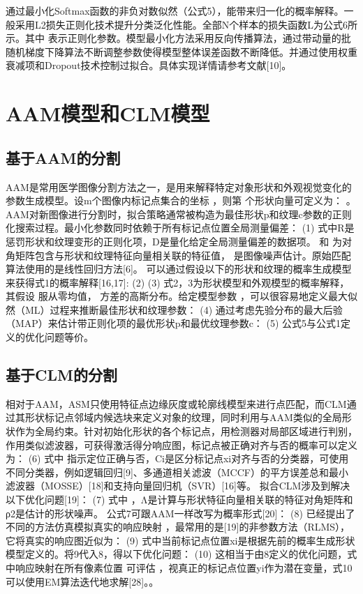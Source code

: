 通过最小化Softmax函数的非负对数似然（公式5），能带来归一化的概率解释。一般采用L2损失正则化技术提升分类泛化性能。全部N个样本的损失函数L为公式6所示。其中  表示正则化参数。模型最小化方法采用反向传播算法，通过带动量的批随机梯度下降算法不断调整参数使得模型整体误差函数不断降低。并通过使用权重衰减项和Dropout技术控制过拟合。具体实现详情请参考文献[10]。

\section{AAM模型和CLM模型} 
\subsection{基于AAM的分割} 
AAM是常用医学图像分割方法之一，是用来解释特定对象形状和外观视觉变化的参数生成模型。设m个图像内标记点集合的坐标  ，则第 个形状向量可定义为： 。 AAM对新图像进行分割时，拟合策略通常被构造为最佳形状p和纹理c参数的正则化搜索过程。最小化参数同时依赖于所有标记点位置全局测量偏差：
  (1)
式中R是惩罚形状和纹理变形的正则化项，D是量化给定全局测量偏差的数据项。 和 为对角矩阵包含与形状和纹理特征向量相关联的特征值， 是图像噪声估计。原始匹配算法使用的是线性回归方法[6]。
可以通过假设以下的形状和纹理的概率生成模型来获得式1的概率解释[16,17]:  
     (2)
	  	(3)
式2，3为形状模型和外观模型的概率解释，其假设  服从零均值， 方差的高斯分布。给定模型参数 ，可以很容易地定义最大似然（ML）过程来推断最佳形状和纹理参数：
  	      (4)
通过考虑先验分布的最大后验（MAP）来估计带正则化项的最优形状p和最优纹理参数c：
  (5)
公式5与公式1定义的优化问题等价。
\subsection{基于CLM的分割}
相对于AAM，ASM只使用特征点边缘灰度或轮廓线模型来进行点匹配，而CLM通过其形状标记点邻域内候选块来定义对象的纹理，同时利用与AAM类似的全局形状作为全局约束。针对初始化形状的各个标记点，用检测器对局部区域进行判别，作用类似滤波器，可获得激活得分响应图，标记点被正确对齐与否的概率可以定义为：
  	(6)
式中 指示定位正确与否，Ci是区分标记点xi对齐与否的分类器，可使用不同分类器，例如逻辑回归[9]、多通道相关滤波（MCCF）的平方误差总和最小滤波器（MOSSE）[18]和支持向量回归机（SVR）[16]等。
拟合CLM涉及到解决以下优化问题[19]： 
  	(7)
式中  ，Λ是计算与形状特征向量相关联的特征对角矩阵和ρ2是估计的形状噪声。
公式7可跟AAM一样改写为概率形式[20]：
  	(8)
已经提出了不同的方法仿真模拟真实的响应映射 ，最常用的是[19]的非参数方法（RLMS），它将真实的响应图近似为： 
	  	(9)
式中当前标记点位置xi是根据先前的概率生成形状模型定义的。将9代入8，得以下优化问题：
  	(10)
这相当于由8定义的优化问题，式中响应映射在所有像素位置  可评估 ，视真正的标记点位置yi作为潜在变量，式10可以使用EM算法迭代地求解[28]。。
 
